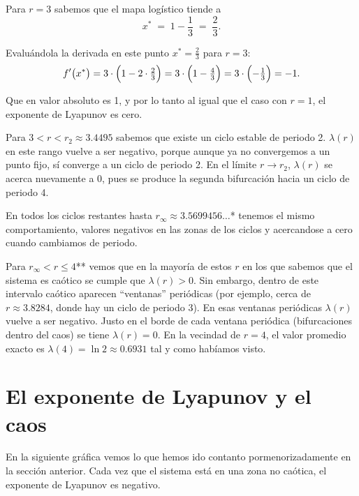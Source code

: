 \documentclass[
  10pt,
  a4paper,
  DIV=11,
  numbers=noendperiod,
  open=any]{scrreprt}
\numberwithin{equation}{chapter}
\numberwithin{equation}{chapter}
\renewcommand{\[}{\begin{equation}}
\renewcommand{\]}{\end{equation}}
\begin{document}
Para \(r = 3\) sabemos que el mapa logístico tiende a \[
   x^* \;=\; 1 - \frac{1}{3} \;=\; \frac{2}{3}.
   \]

Evaluándola la derivada en este punto \(x^* = \tfrac{2}{3}\) para
\(r = 3\): \[
   f'\bigl(x^*\bigr) 
   = 3 \cdot \Bigl(1 - 2 \cdot \tfrac{2}{3}\Bigr) 
   = 3 \cdot \Bigl(1 - \tfrac{4}{3}\Bigr) 
   = 3 \cdot \Bigl(-\tfrac{1}{3}\Bigr) 
   = -1.
   \]

Que en valor absoluto es 1, y por lo tanto al igual que el caso con
\(r=1\), el exponente de Lyapunov es cero.

Para \textbf{\(3 < r < r_2 \approx 3.4495\)} sabemos que existe un ciclo
estable de periodo 2. \(\lambda(r)\) en este rango vuelve a ser
negativo, porque aunque ya no convergemos a un punto fijo, sí converge a
un ciclo de periodo 2. En el límite \(r \to r_2\), \(\lambda(r)\) se
acerca nuevamente a 0, pues se produce la segunda bifurcación hacia un
ciclo de periodo 4.

En todos los ciclos restantes hasta \(r_\infty \approx 3.5699456\dots\)*
tenemos el mismo comportamiento, valores negativos en las zonas de los
ciclos y acercandose a cero cuando cambiamos de periodo.

Para \(r_\infty < r \le 4\)** vemos que en la mayoría de estos \(r\) en
los que sabemos que el sistema es caótico se cumple que
\(\lambda(r) > 0\). Sin embargo, dentro de este intervalo caótico
aparecen ``ventanas'' periódicas (por ejemplo, cerca de
\(r\approx 3.8284\), donde hay un ciclo de periodo 3). En esas ventanas
periódicas \(\lambda(r)\) vuelve a ser negativo. Justo en el borde de
cada ventana periódica (bifurcaciones dentro del caos) se tiene
\(\lambda(r)=0\). En la vecindad de \(r = 4\), el valor promedio exacto
es \(\lambda(4) = \ln 2 \approx 0.6931\) tal y como habíamos visto.


\chapter{El exponente de Lyapunov y el
caos}\label{el-exponente-de-lyapunov-y-el-caos}

En la siguiente gráfica vemos lo que hemos ido contanto
pormenorizadamente en la sección anterior. Cada vez que el sistema está
en una zona no caótica, el exponente de Lyapunov es negativo.
\end{document}
